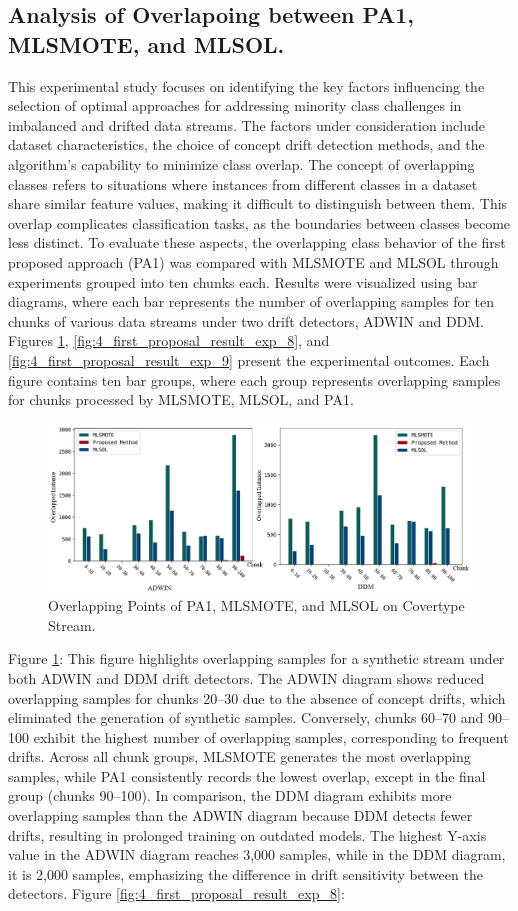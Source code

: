 \subsection{Analysis of Overlapoing between PA1, MLSMOTE, and MLSOL.}
This experimental study focuses on identifying the key factors influencing the selection of optimal approaches for addressing minority class challenges in imbalanced and drifted data streams. The factors under consideration include dataset characteristics, the choice of concept drift detection methods, and the algorithm's capability to minimize class overlap.
The concept of overlapping classes refers to situations where instances from different classes in a dataset share similar feature values, making it difficult to distinguish between them. This overlap complicates classification tasks, as the boundaries between classes become less distinct. To evaluate these aspects, the overlapping class behavior of the first proposed approach (PA1) was compared with MLSMOTE and MLSOL through experiments grouped into ten chunks each. Results were visualized using bar diagrams, where each bar represents the number of overlapping samples for ten chunks of various data streams under two drift detectors, ADWIN and DDM. Figures \ref{fig:4_first_proposal_result_exp_7}, \ref{fig:4_first_proposal_result_exp_8}, and \ref{fig:4_first_proposal_result_exp_9} present the experimental outcomes. Each figure contains ten bar groups, where each group represents overlapping samples for chunks processed by MLSMOTE, MLSOL, and PA1.
\begin{figure}[H]
	\centering
	\includegraphics[width=0.9\linewidth]{4_Imbalanced/figures/exp_7.png}
  \caption{Overlapping Points of PA1, MLSMOTE, and MLSOL on Covertype Stream.}
	\label{fig:4_first_proposal_result_exp_7}
\end{figure}
Figure \ref{fig:4_first_proposal_result_exp_7}:
This figure highlights overlapping samples for a synthetic stream under both ADWIN and DDM drift detectors. The ADWIN diagram shows reduced overlapping samples for chunks 20–30 due to the absence of concept drifts, which eliminated the generation of synthetic samples. Conversely, chunks 60–70 and 90–100 exhibit the highest number of overlapping samples, corresponding to frequent drifts. Across all chunk groups, MLSMOTE generates the most overlapping samples, while PA1 consistently records the lowest overlap, except in the final group (chunks 90–100). In comparison, the DDM diagram exhibits more overlapping samples than the ADWIN diagram because DDM detects fewer drifts, resulting in prolonged training on outdated models. The highest Y-axis value in the ADWIN diagram reaches 3,000 samples, while in the DDM diagram, it is 2,000 samples, emphasizing the difference in drift sensitivity between the detectors. Figure \ref{fig:4_first_proposal_result_exp_8}:
